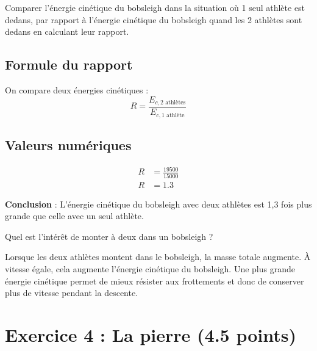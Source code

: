\documentclass[answers]{exam}
\begin{document}
\begin{questions}
\begin{solution}
\end{solution}

\question[1] Comparer l'énergie cinétique du bobsleigh dans la situation où 1 seul athlète est dedans, par rapport à l'énergie cinétique du bobsleigh quand les 2 athlètes sont dedans en calculant leur rapport.

\begin{solution}

\subsection*{Formule du rapport}
On compare deux énergies cinétiques :
\[
R = \frac{E_{c,\text{2 athlètes}}}{E_{c,\text{1 athlète}}}
\]

\subsection*{Valeurs numériques}
\begin{align*}
R &= \frac{19500}{15000} \\
R &= 1.3
\end{align*}

\textbf{Conclusion} : L'énergie cinétique du bobsleigh avec deux athlètes est 1,3 fois plus grande que celle avec un seul athlète.
\end{solution}

\question[0.5] Quel est l'intérêt de monter à deux dans un bobsleigh ?

\begin{solution}
Lorsque les deux athlètes montent dans le bobsleigh, la masse totale augmente. À vitesse égale, cela augmente l’énergie cinétique du bobsleigh. Une plus grande énergie cinétique permet de mieux résister aux frottements et donc de conserver plus de vitesse pendant la descente.
\end{solution}

\end{questions}

\section*{Exercice 4 : La pierre (4.5 points)}
\end{document}
